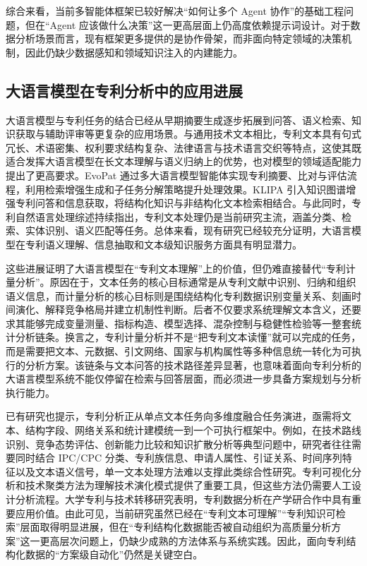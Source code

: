 综合来看，当前多智能体框架已较好解决“如何让多个 Agent 协作”的基础工程问题，但在“Agent 应该做什么决策”这一更高层面上仍高度依赖提示词设计。对于数据分析场景而言，现有框架更多提供的是协作骨架，而非面向特定领域的决策机制，因此仍缺少数据感知和领域知识注入的内建能力。

\subsection{大语言模型在专利分析中的应用进展}

大语言模型与专利任务的结合已经从早期摘要生成逐步拓展到问答、语义检索、知识获取与辅助评审等更复杂的应用场景。与通用技术文本相比，专利文本具有句式冗长、术语密集、权利要求结构复杂、法律语言与技术语言交织等特点，这使其既适合发挥大语言模型在长文本理解与语义归纳上的优势，也对模型的领域适配能力提出了更高要求。EvoPat\cite{wang2024evopat} 通过多大语言模型智能体实现专利摘要、比对与评估流程，利用检索增强生成和子任务分解策略提升处理效果。KLIPA\cite{deng2025klipa} 引入知识图谱增强专利问答和信息获取，将结构化知识与非结构化文本检索相结合。与此同时，专利自然语言处理综述持续指出，专利文本处理仍是当前研究主流，涵盖分类、检索、实体识别、语义匹配等任务\cite{jiang2025natural}。总体来看，现有研究已经较充分证明，大语言模型在专利语义理解、信息抽取和文本级知识服务方面具有明显潜力。

这些进展证明了大语言模型在“专利文本理解”上的价值，但仍难直接替代“专利计量分析”。原因在于，文本任务的核心目标通常是从专利文献中识别、归纳和组织语义信息，而计量分析的核心目标则是围绕结构化专利数据识别变量关系、刻画时间演化、解释竞争格局并建立机制性判断。后者不仅要求系统理解文本含义，还要求其能够完成变量测量、指标构造、模型选择、混杂控制与稳健性检验等一整套统计分析链条\cite{basberg1987patents,trajtenberg1990penny,daim2006forecasting}。换言之，专利计量分析并不是“把专利文本读懂”就可以完成的任务，而是需要把文本、元数据、引文网络、国家与机构属性等多种信息统一转化为可执行的分析方案。该链条与文本问答的技术路径差异显著，也意味着面向专利分析的大语言模型系统不能仅停留在检索与回答层面，而必须进一步具备方案规划与分析执行能力。

已有研究也提示，专利分析正从单点文本任务向多维度融合任务演进，亟需将文本、结构字段、网络关系和统计建模统一到一个可执行框架中\cite{zhu2014patent,mejia2024patent}。例如，在技术路线识别、竞争态势评估、创新能力比较和知识扩散分析等典型问题中，研究者往往需要同时结合 IPC/CPC 分类、专利族信息、申请人属性、引证关系、时间序列特征以及文本语义信号，单一文本处理方法难以支撑此类综合性研究。专利可视化分析\cite{park2012visualization}和技术聚类方法\cite{lee2015technology}为理解技术演化模式提供了重要工具，但这些方法仍需要人工设计分析流程。大学专利与技术转移研究\cite{chen2004university}表明，专利数据分析在产学研合作中具有重要应用价值。由此可见，当前研究虽然已经在“专利文本可理解”“专利知识可检索”层面取得明显进展，但在“专利结构化数据能否被自动组织为高质量分析方案”这一更高层次问题上，仍缺少成熟的方法体系与系统实践。因此，面向专利结构化数据的“方案级自动化”仍然是关键空白。

